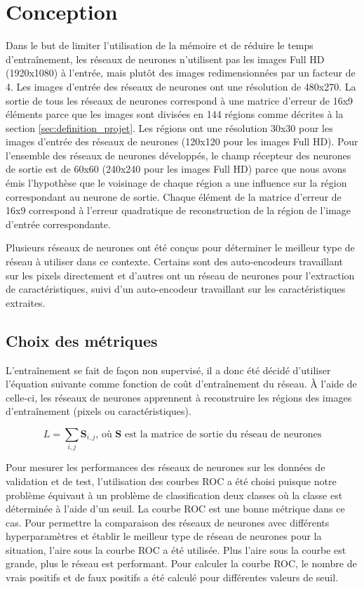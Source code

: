\section{Conception}
    Dans le but de limiter l'utilisation de la mémoire et de réduire le temps d'entraînement, les réseaux de neurones n'utilisent pas les images Full HD (1920x1080) à l'entrée, mais plutôt des images redimensionnées par un facteur de 4. Les images d'entrée des réseaux de neurones ont une résolution de 480x270. La sortie de tous les réseaux de neurones correspond à une matrice d'erreur de 16x9 éléments parce que les images sont divisées en 144 régions comme décrites à la section \ref{sec:definition_projet}. Les régions ont une résolution 30x30 pour les images d'entrée des réseaux de neurones (120x120 pour les images Full HD). Pour l'ensemble des réseaux de neurones développés, le champ récepteur des neurones de sortie est de 60x60 (240x240 pour les images Full HD) parce que nous avons émis l'hypothèse que le voisinage de chaque région a une influence sur la région correspondant au neurone de sortie. Chaque élément de la matrice d'erreur de 16x9 correspond à l'erreur quadratique de reconstruction de la région de l'image d'entrée correspondante.
    \bigskip
    
    Plusieurs réseaux de neurones ont été conçus pour déterminer le meilleur type de réseau à utiliser dans ce contexte. Certains sont des auto-encodeurs travaillant sur les pixels directement et d'autres ont un réseau de neurones pour l'extraction de caractéristiques, suivi d'un auto-encodeur travaillant sur les caractéristiques extraites.

\subsection{Choix des métriques}
    L'entraînement se fait de façon non supervisé, il a donc été décidé d'utiliser l'équation suivante comme fonction de coût d'entraînement du réseau. À l'aide de celle-ci, les réseaux de neurones apprennent à reconstruire les régions des images d'entraînement (pixels ou caractéristiques).
    
    \begin{equation}
        L = \sum_{i,j} \mathbf{S}_{i,j} \text{, où } \mathbf{S} \text{ est la matrice de sortie du réseau de neurones}
    \end{equation}
    
    Pour mesurer les performances des réseaux de neurones sur les données de validation et de test, l'utilisation des courbes ROC a été choisi puisque notre problème équivaut à un problème de classification deux classes où la classe est déterminée à l'aide d'un seuil. La courbe ROC est une bonne métrique dans ce cas. Pour permettre la comparaison des réseaux de neurones avec différents hyperparamètres et établir le meilleur type de réseau de neurones pour la situation, l'aire sous la courbe ROC a été utilisée. Plus l'aire sous la courbe est grande, plus le réseau est performant. Pour calculer la courbe ROC, le nombre de vrais positifs et de faux positifs a été calculé pour différentes valeurs de seuil.

